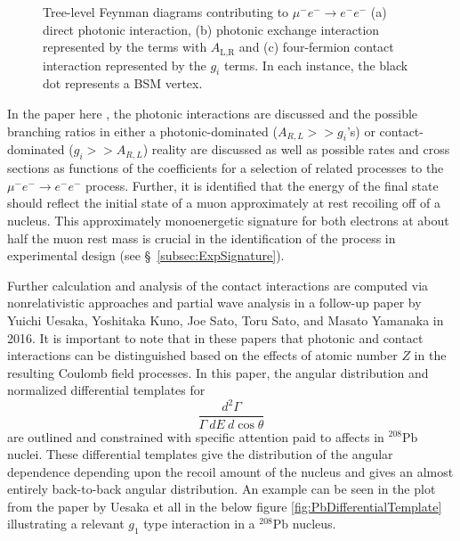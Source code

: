 \documentclass[12pt]{article}
\newcommand{\muEtoEE}{\mu^- e^- \to e^- e^-}
\begin{document}
\begin{figure}[h!]
\begin{subfigure}[b]{0.32\textwidth}
        \caption{}
        \label{fig:contact-interaction}
    \end{subfigure}

    \caption{Tree-level Feynman diagrams contributing to
    $\mu^- e^- \to e^- e^-$ (a) direct photonic interaction,
    (b) photonic exchange interaction represented by the terms with $A_{\text{L,R}}$ and (c) four-fermion contact interaction represented by the $g_i$ terms. In each instance, the black dot represents a BSM vertex.}
    \label{fig:clfv-interaction-diagrams}
\end{figure}

In the paper here \cite{NewProcess2010}, the photonic interactions are discussed and the possible branching ratios in either a photonic-dominated ($A_{R,L}>>g_i$'s) or contact-dominated ($g_i >> A_{R,L}$) reality are discussed as well as possible rates and cross sections as functions of the coefficients for a selection of related processes to the $\muEtoEE$ process. Further, it is identified that the energy of the final state should reflect the initial state of a muon approximately at rest recoiling off of a nucleus. This approximately monoenergetic signature for both electrons at about half the muon rest mass is crucial in the identification of the process in experimental design (see \S~\ref{subsec:ExpSignature}).

Further calculation and analysis of the contact interactions are computed via nonrelativistic approaches and partial wave analysis in a follow-up paper \cite{ImprovedAnalyses2016} by Yuichi Uesaka, Yoshitaka Kuno, Joe Sato, Toru Sato, and Masato Yamanaka in 2016. It is important to note that in these papers that photonic and contact interactions can be distinguished based on the effects of atomic number $Z$ in the resulting Coulomb field processes. In this paper, the angular distribution and normalized differential templates for 
\begin{equation}\label{eqn:differentialTemplate}
    \frac{d^2\Gamma}{\Gamma \ dE \ d\cos\theta}
\end{equation}
are outlined and constrained with specific attention paid to affects in $^{208}\text{Pb}$ nuclei. These differential templates give the distribution of the angular dependence depending upon the recoil amount of the nucleus and gives an almost entirely back-to-back angular distribution. An example can be seen in the plot from the paper by Uesaka et all in the below figure \ref{fig:PbDifferentialTemplate} illustrating a relevant $g_1$ type interaction in a $^{208}\text{Pb}$ nucleus.
\end{document}
